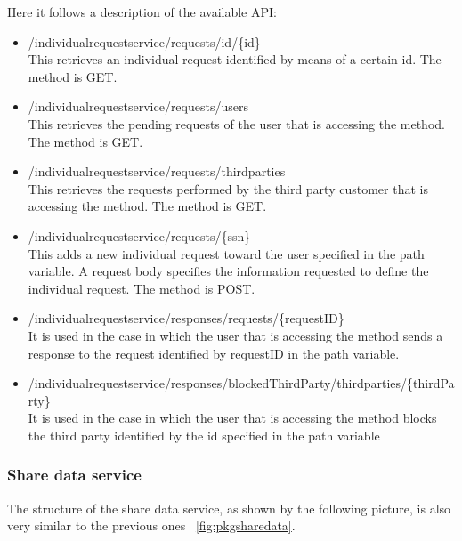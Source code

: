 Here it follows a description of the available API:
\begin{itemize}
\item /individualrequestservice/requests/id/\{id\} \\
This retrieves an individual request identified by means of a certain id. 
The method is GET.

\item /individualrequestservice/requests/users \\ 
This retrieves the pending requests of the user that is accessing the method. 
The method is GET.

\item /individualrequestservice/requests/thirdparties \\ 
This retrieves the requests performed by the third party customer that is accessing the method.
The method is GET.

\item /individualrequestservice/requests/\{ssn\} \\
This adds a new individual request toward the user specified in the path variable.
A request body specifies the information requested to define the individual request.
The method is POST. 

\item /individualrequestservice/responses/requests/\{requestID\} \\
It is used in the case in which the user that is accessing the method
sends a response to the request identified by requestID in the path variable.

\item /individualrequestservice/responses/blockedThirdParty/thirdparties/\{thirdParty\} \\
It is used in the case in which the user that is accessing the method blocks the third party identified by the id specified in the path variable
\end{itemize}

\subsubsection{Share data service}
The structure of the share data service, as shown by the following picture, is also very similar to the previous ones 
~\ref{fig:pkgsharedata}.

